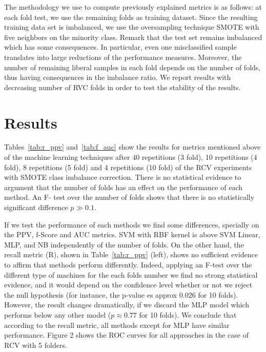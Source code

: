 \documentclass[onesided]{article}\usepackage[]{graphicx}\usepackage[]{color}
\begin{document}
The methodology we use to compute previously explained metrics is as follows: at each fold test, we use the remaining folds as training dataset. Since the resulting training data set is imbalanced, we use the oversampling technique SMOTE with five neighbors on the minority class. Remark that the test set remains imbalanced which has some consequences. In particular, even one misclassified sample translates into large reductions of the performance measures. Moreover, the number of remaining liberal samples in each fold depends on the number of folds, thus having consequences in the imbalance ratio. We report results with decreasing number of RVC folds in order to test the stability of the results.

\section{Results}

Tables~\ref{tab:r_ppv} and~\ref{tab:f_auc} show the results for  metrics mentioned above of the machine learning techniques after 40 repetitions (3 fold), 10 repetitions (4 fold), 8 repetitions (5 fold) and 4 repetitions (10 fold) of the RCV experiments with SMOTE class imbalance correction. There is no statistical evidence to argument that the number of folds has an effect on the performance of each method. An F- test over the number of folds shows that there is no statistically significant difference $p\gg0.1$.

If we test the performance of each methods we find some differences, specially on the PPV, f-Score and AUC metrics. SVM with RBF kernel is above SVM Linear, MLP, and NB independently of the number of folds. On the other hand, the recall metric (R), shown in Table~\ref{tab:r_ppv} (left), shows no sufficient evidence to affirm that methods perform differently. Indeed, applying an F-test over the different type of machines for the each folds number we find no strong statistical evidence, and it would depend on the confidence level whether or not we reject the null hypothesis  (for instance, the p-value es approx $0.026$ for 10 folds). However, the result changes dramatically, if we discard the MLP model which performs below any other model ($p\approx0.77$ for 10 folds). We conclude that according to the recall metric, all methods except for MLP have similar performance. Figure 2 shows the ROC curves for all approaches in the case of RCV with 5 folders.
\end{document}
